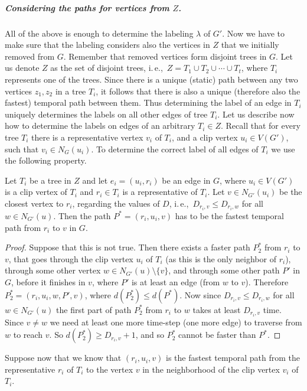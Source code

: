 \documentclass[a4paper,UKenglish,cleveref, autoref, thm-restate]{lipics-v2021}
\newcommand{\ie}{i.\,e.,\ }
\begin{document}
\subparagraph{\boldmath Considering the paths for vertices from $Z$.}
All of the above is enough to determine the labeling $\lambda$ of $G'$. Now we have to make sure that the labeling considers also the vertices in $Z$ that we initially removed from $G$.
Remember that removed vertices form disjoint trees in $G$.
Let us denote $Z$ as the set of disjoint trees, \ie $Z = T_1 \cup T_2 \cup \cdots \cup T_t$, where $T_i$ represents one of the trees.
Since there is a unique (static) path between any two vertices $z_1, z_2$ in a tree $T_i$,
it follows that there is also a unique (therefore also the fastest) temporal path between them.
Thus determining the label of an edge in $T_i$ uniquely determines the labels on all other edges of tree $T_i$.
Let us describe now how to determine the labels on edges of an arbitrary $T_i \in Z$.
Recall that for every tree $T_i$ there is a representative vertex $v_i$ of $T_i$,
and a clip vertex $u_i \in V(G')$, such that $v_i \in N_G(u_i)$.
To determine the correct label of all edges of $T_i$ we use the following property.
\begin{lemma}
Let $T_i$ be a tree in $Z$ and let $e_i = (u_i,r_i)$ be an edge in $G$, where $u_i \in V(G')$ is a clip vertex of $T_i$ and $r_i \in T_i$ is a representative of $T_i$.
Let $v \in N_{G'}(u_i)$ be the closest vertex to $r_i$, regarding the values of $D$, \ie  $D_{r_i,v} \leq D_{r_i,w}$ for all $w \in N_{G'}(u)$.
Then the path $P^*=(r_i,u_i,v)$ has to be the fastest temporal path from $r_i$ to $v$ in $G$.
\end{lemma}
\begin{proof}
Suppose that this is not true.
Then there exists a faster path $P^*_2$ from $r_i$ to $v$, that goes through the clip vertex $u_i$ of $T_i$ (as this is the only neighbor of $r_i$), through some other vertex $w \in N_{G'}(u) \setminus \{v \}$, 
and through some other path $P'$ in $G$, before it finishes in $v$, where $P'$ is at least an edge (from $w$ to $v$). 
Therefore $P^*_2= (r_i,u_i,w,P',v)$, where $d(P^*_2) \leq d(P^*)$.
Now since $D_{r_i,v} \leq D_{r_i,w}$ for all $ w\in N_{G'}(u)$ the first part of path $P^*_2$ from $r_i$ to $w$ takes at least $D_{r_i,v}$ time.
Since $v \neq w$ we need at least one more time-step (one more edge) to traverse from $w$ to reach $v$. 
So $d(P^*_2) \geq D_{r_i,v} + 1$, and so $P^*_2$ cannot be faster than $P^*$.
\end{proof}
Suppose now that we know that 
$(r_i,u_i,v)$ is the fastest temporal path from the representative $r_i$ of $T_i$ to the vertex $v$ in the neighborhood of the clip vertex $v_i$ of $T_i$.
\end{document}
